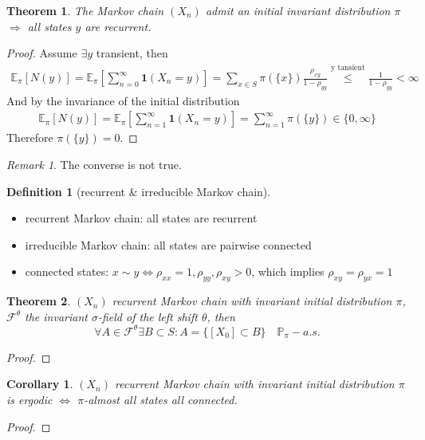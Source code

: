 \documentclass[a4paper,11pt]{book}
\newtheorem{theorem}{Theorem}[section]
\newtheorem{corollary}{Corollary}[theorem]
\theoremstyle{definition}
\newtheorem{definition}{Definition}[section]
\theoremstyle{remark}
\newtheorem*{remark}{Remark}
\begin{document}
\begin{theorem}
	The Markov chain $(X_n)$ admit an initial invariant distribution $\pi$ $\Rightarrow$ all states $y$ are recurrent.
\end{theorem}
\begin{proof}
	Assume $\exists y$ transient, then 
	\begin{align*}
		\mathbb{E}_\pi[N(y)] = \mathbb{E}_\pi[\sum_{n = 0}^\infty \textbf{1}(X_n = y)] = \sum_{x \in S} \pi(\{x\})\frac{\rho_{xy}}{1 - \rho_{yy}} \overset{\text{y tansient}}{\leq}\frac{1}{1-\rho_{yy}} < \infty
	\end{align*}
	And by the invariance of the initial distribution
	\begin{align*}
		\mathbb{E}_\pi[N(y)] = \mathbb{E}_\pi[\sum_{n = 1}^\infty \textbf{1}(X_n = y)] = \sum_{n = 1}^\infty \pi(\{y\}) \in \{0, \infty\}
	\end{align*}
	Therefore $\pi(\{y\}) = 0$. 
\end{proof}
\begin{remark}
The converse is not true.	
\end{remark}

\begin{definition}[recurrent \& irreducible Markov chain]\quad
\begin{itemize}
	\item recurrent Markov chain: all states are recurrent
	\item irreducible Markov chain: all states are pairwise connected
	\item connected states: $x \sim y \Leftrightarrow \rho_{xx} = 1, \rho_{yy}, \rho_{xy} > 0$, which implies $\rho_{xy} = \rho_{yx}= 1$
\end{itemize}
\end{definition}

\begin{theorem}
	$(X_n)$ recurrent Markov chain with invariant initial distribution $\pi$, $\mathcal{F}^\theta$ the invariant $\sigma$-field of the left shift $\theta$, then
	\begin{equation*}
		\forall A \in \mathcal{F}^\theta \exists B \subset S: A = \{[X_0] \subset B\} \quad \mathbb{P}_\pi-a.s.
	\end{equation*}
\end{theorem}
\begin{proof}
\end{proof}

\begin{corollary}
$(X_n)$ recurrent Markov chain with invariant initial distribution $\pi$ is ergodic $\Leftrightarrow$ $\pi$-almost all states all connected.
\end{corollary}
\begin{proof}
\end{proof}
\end{document}
